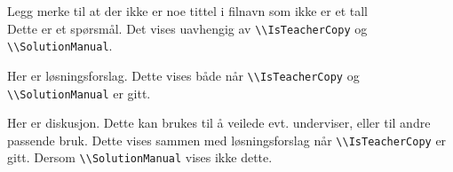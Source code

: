 Legg merke til at der ikke er noe tittel i filnavn som ikke er et tall\\
\bpa
  \bppa
    Dette er et spørsmål. Det vises uavhengig av \lstinline{\\IsTeacherCopy} og \lstinline{\\SolutionManual}.
    \begin{solution}
      Her er løsningsforslag. Dette vises både når \lstinline{\\IsTeacherCopy} og \lstinline{\\SolutionManual} er gitt.
    \end{solution}
    \begin{direction}
      Her er diskusjon. Dette kan brukes til å veilede evt. underviser, eller til andre passende bruk. Dette vises sammen med løsningsforslag når \lstinline{\\IsTeacherCopy} er gitt. Dersom \lstinline{\\SolutionManual} vises ikke dette.
    \end{direction}
  \epp
\epa
